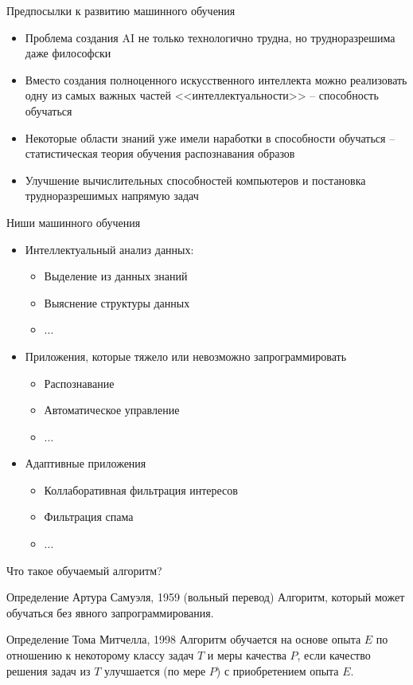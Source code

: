 \documentclass[compress,red,unicode]{beamer}
\begin{document}
\begin{frame}{Предпосылки к развитию машинного обучения}
\begin{itemize}
	\item Проблема создания AI не только технологично трудна, но трудноразрешима даже философски
	\item Вместо создания полноценного искусственного интеллекта можно реализовать одну из самых важных частей <<интеллектуальности>> -- способность обучаться
	\item Некоторые области знаний уже имели наработки в способности обучаться -- статистическая теория обучения распознавания образов	
	\item Улучшение вычислительных способностей компьютеров и постановка трудноразрешимых напрямую задач
\end{itemize}
\end{frame}

\begin{frame}{Ниши машинного обучения}
\begin{itemize}
\item Интеллектуальный анализ данных:
\begin{itemize}
	\item Выделение из данных знаний
	\item Выяснение структуры данных
	\item ...
\end{itemize}
\item Приложения, которые тяжело или невозможно запрограммировать
\begin{itemize}
	\item Распознавание
	\item Автоматическое управление
	\item ...
\end{itemize}
\item Адаптивные приложения
\begin{itemize}
	\item Коллаборативная фильтрация интересов
	\item Фильтрация спама
	\item ...
\end{itemize}
\end{itemize}
\end{frame}


\begin{frame}{Что такое обучаемый алгоритм?}
\begin{block}{Определение Артура Самуэля, 1959 (вольный перевод)}
Алгоритм, который может обучаться без явного запрограммирования.
\end{block}

\begin{block}{Определение Тома Митчелла, 1998}
Алгоритм обучается на основе опыта {\color{main!70!black}$E$} по отношению к некоторому классу задач {\color{main!70!black}$T$} и меры качества {\color{main!70!black}$P$}, если качество решения задач из {\color{main!70!black}$T$} улучшается (по мере {\color{main!70!black}$P$}) с приобретением опыта {\color{main!70!black}$E$}.
\end{block}
\end{frame}
\end{document}

